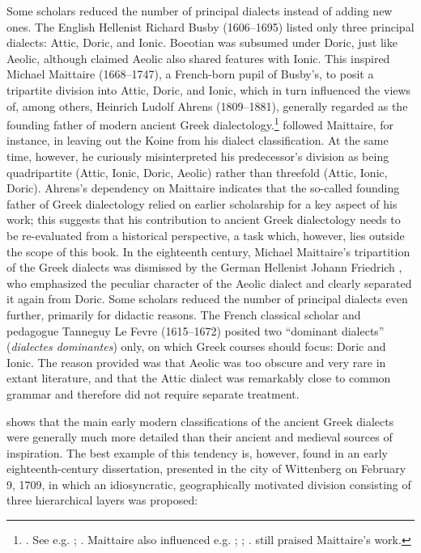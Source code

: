 {Some scholars reduced the number of principal dialects instead of adding new ones. The English Hellenist Richard Busby (1606–1695) listed only three principal dialects: Attic, Doric, and Ionic. Boeotian was subsumed under Doric, just like Aeolic, although \citet[66--67]{Busby1696} claimed Aeolic also shared features with Ionic. This inspired Michael Maittaire (1668–1747), a French-born pupil of Busby’s, to posit a tripartite division into Attic, Doric, and Ionic, which in turn influenced the views of, among others, Heinrich Ludolf Ahrens (1809–1881), generally regarded as the founding father of modern ancient Greek dialectology.\footnote{\citet[i–ii]{Maittaire1706}. See e.g. \citet[\textsc{viii}.177]{Brekle1992}; \citet[463]{Finkelberg2014}. Maittaire also influenced e.g. \citet[213]{Thompson1732}; \citet[162]{Gesner1774}; \citet[\textsc{xxviii}]{Harles1778}. \citet[(1884–1890): 92]{Pott1974} still praised Maittaire’s work.} \citet[\textsc{i.}1]{Ahrens1839} followed Maittaire, for instance, in leaving out the Koine from his dialect classification. At the same time, however, he curiously misinterpreted his predecessor’s division as being quadripartite (Attic, Ionic, Doric, Aeolic) rather than threefold (Attic, Ionic, Doric). Ahrens’s dependency on Maittaire indicates that the so-called founding father of Greek dialectology relied on earlier scholarship for a key aspect of his work; this suggests that his contribution to ancient Greek dialectology needs to be re-evaluated from a historical perspective, a task which, however, lies outside the scope of this book. In the eighteenth century, Michael Maittaire’s tripartition of the Greek dialects was dismissed by the German Hellenist Johann Friedrich \citet[\textsc{iv–v}]{Facius1782}, who emphasized the peculiar character of the Aeolic dialect and clearly separated it again from Doric. Some scholars reduced the number of principal dialects even further, primarily for didactic reasons. The French classical scholar and pedagogue Tanneguy Le Fevre (1615–1672) posited two “dominant dialects” (\textit{dialectes dominantes}) only, on which Greek courses should focus: Doric and Ionic. The reason \citet[61]{Le1731} provided was that Aeolic was too obscure and very rare in extant literature, and that the Attic dialect was remarkably close to common grammar and therefore did not require separate treatment.

 shows that the main early modern classifications of the ancient Greek dialects were generally much more detailed than their ancient and medieval sources of inspiration. The best example of this tendency is, however, found in an early eighteenth-century dissertation, presented in the city of Wittenberg on February 9, 1709, in which an idiosyncratic, geographically motivated division consisting of three hierarchical layers was proposed:

}

